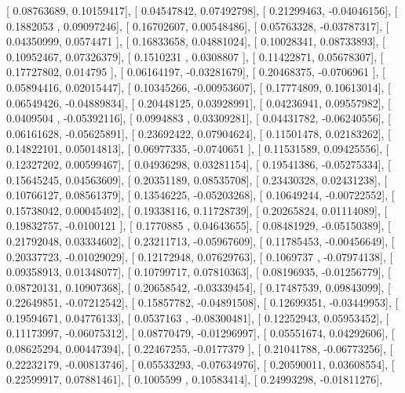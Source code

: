\documentclass{article}
\begin{document}
       [ 0.08763689,  0.10159417],
       [ 0.04547842,  0.07492798],
       [ 0.21299463, -0.04046156],
       [ 0.1882053 ,  0.09097246],
       [ 0.16702607,  0.00548486],
       [ 0.05763328, -0.03787317],
       [ 0.04350999,  0.0574471 ],
       [ 0.16833658,  0.04881024],
       [ 0.10028341,  0.08733893],
       [ 0.10952467,  0.07326379],
       [ 0.1510231 ,  0.0308807 ],
       [ 0.11422871,  0.05678307],
       [ 0.17727802,  0.014795  ],
       [ 0.06164197, -0.03281679],
       [ 0.20468375, -0.0706961 ],
       [ 0.05894416,  0.02015447],
       [ 0.10345266, -0.00953607],
       [ 0.17774809,  0.10613014],
       [ 0.06549426, -0.04889834],
       [ 0.20448125,  0.03928991],
       [ 0.04236941,  0.09557982],
       [ 0.0409504 , -0.05392116],
       [ 0.0994883 ,  0.03309281],
       [ 0.04431782, -0.06240556],
       [ 0.06161628, -0.05625891],
       [ 0.23692422,  0.07904624],
       [ 0.11501478,  0.02183262],
       [ 0.14822101,  0.05014813],
       [ 0.06977335, -0.0740651 ],
       [ 0.11531589,  0.09425556],
       [ 0.12327202,  0.00599467],
       [ 0.04936298,  0.03281154],
       [ 0.19541386, -0.05275334],
       [ 0.15645245,  0.04563609],
       [ 0.20351189,  0.08535708],
       [ 0.23430328,  0.02431238],
       [ 0.10766127,  0.08561379],
       [ 0.13546225, -0.05203268],
       [ 0.10649244, -0.00722552],
       [ 0.15738042,  0.00045402],
       [ 0.19338116,  0.11728739],
       [ 0.20265824,  0.01114089],
       [ 0.19832757, -0.0100121 ],
       [ 0.1770885 ,  0.04643655],
       [ 0.08481929, -0.05150389],
       [ 0.21792048,  0.03334602],
       [ 0.23211713, -0.05967609],
       [ 0.11785453, -0.00456649],
       [ 0.20337723, -0.01029029],
       [ 0.12172948,  0.07629763],
       [ 0.1069737 , -0.07974138],
       [ 0.09358913,  0.01348077],
       [ 0.10799717,  0.07810363],
       [ 0.08196935, -0.01256779],
       [ 0.08720131,  0.10907368],
       [ 0.20658542, -0.03339454],
       [ 0.17487539,  0.09843099],
       [ 0.22649851, -0.07212542],
       [ 0.15857782, -0.04891508],
       [ 0.12699351, -0.03449953],
       [ 0.19594671,  0.04776133],
       [ 0.0537163 , -0.08300481],
       [ 0.12252943,  0.05953452],
       [ 0.11173997, -0.06075312],
       [ 0.08770479, -0.01296997],
       [ 0.05551674,  0.04292606],
       [ 0.08625294,  0.00447394],
       [ 0.22467255, -0.0177379 ],
       [ 0.21041788, -0.06773256],
       [ 0.22232179, -0.00813746],
       [ 0.05533293, -0.07634976],
       [ 0.20590011,  0.03608554],
       [ 0.22599917,  0.07881461],
       [ 0.1005599 ,  0.10583414],
       [ 0.24993298, -0.01811276],
\end{document}
